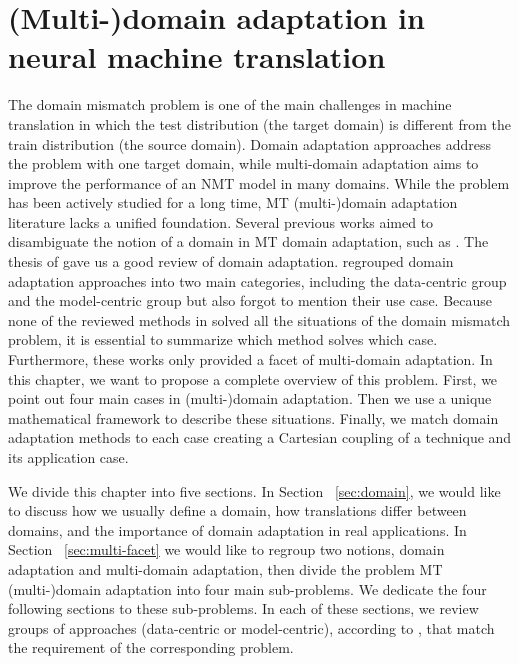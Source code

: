 \chapter{(Multi-)domain adaptation in neural machine translation} \label{chap:mdmt-review}
The domain mismatch problem is one of the main challenges in machine translation \citep{koehn17six} in which the test distribution (the target domain) is different from the train distribution (the source domain). Domain adaptation approaches address the problem with one target domain, while multi-domain adaptation aims to improve the performance of an NMT model in many domains. While the problem has been actively studied for a long time, MT (multi-)domain adaptation literature lacks a unified foundation. Several previous works aimed to disambiguate the notion of a domain in MT domain adaptation, such as \cite{Wees15Whats,Wees17Whats,Saunders21Domain}. The thesis of \cite{Saunders21Domain} gave us a good review of domain adaptation. \citet{Chu18asurvey} regrouped domain adaptation approaches into two main categories, including the data-centric group and the model-centric group but also forgot to mention their use case. Because none of the reviewed methods in \citet{Chu18asurvey} solved all the situations of the domain mismatch problem, it is essential to summarize which method solves which case. Furthermore, these works only provided a facet of multi-domain adaptation. In this chapter, we want to propose a complete overview of this problem. First, we point out four main cases in (multi-)domain adaptation. Then we use a unique mathematical framework to describe these situations. Finally, we match domain adaptation methods to each case creating a Cartesian coupling of a technique and its application case.

We divide this chapter into five sections. In Section ~\ref{sec:domain}, we would like to discuss how we usually define a domain, how translations differ between domains, and the importance of domain adaptation in real applications. In Section ~\ref{sec:multi-facet} we would like to regroup two notions, domain adaptation and multi-domain adaptation, then divide the problem MT (multi-)domain adaptation into four main sub-problems. We dedicate the four following sections to these sub-problems. In each of these sections, we review groups of approaches (data-centric or model-centric), according to \citet{Chu18survey}, that match the requirement of the corresponding problem.
